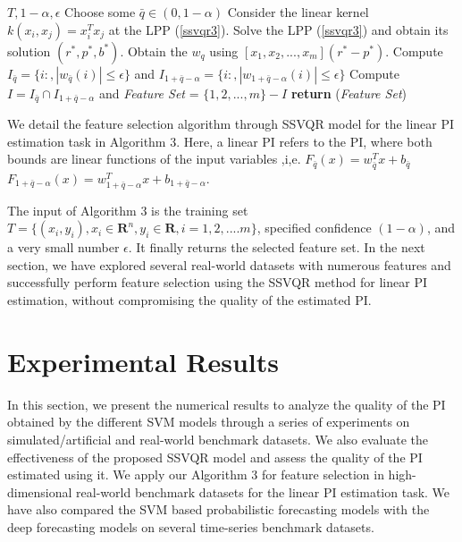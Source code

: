 \documentclass[10pt]{article} %
\begin{document}
\begin{algorithm} 
\caption{Feature selection through SSVQR}\label{alg:euclid}
\begin{algorithmic}[1]
 {$T,1-\alpha, \epsilon$}
\State Choose some $\bar{q} \in (0,1-\alpha)$ 
\State  Consider the linear kernel  $k(x_i,x_j) = x_i ^{T}x_j$ at the  LPP (\ref{ssvqr3}). 
\State  Solve the LPP (\ref{ssvqr3}) and obtain its solution $(r^*,p^*,b^*)$.
\State Obtain  the $w_q$ using  $ [x_1, x_2,...,x_m ](r^*-p^*)$. 
\EndFor \label{euclidendwhile}
\State  Compute $I_{\bar{q}} = \{ i:,| w_{\bar{q}}(i)| \leq \epsilon \}$ and  $I_{1+\bar{q}-\alpha} = \{ i:,| w_{1+\bar{q}-\alpha}(i) | \leq \epsilon \}$
\State Compute $I = I_{\bar{q}} \cap I_{1+\bar{q}-\alpha} $ and \textit{Feature Set} = $\{1,2,...,m\} - I$
\State \textbf{return}  (\textit{Feature Set})
\EndProcedure
\end{algorithmic}
\end{algorithm}
We detail the feature selection algorithm through SSVQR model for the  linear PI estimation task in Algorithm 3. Here, a linear PI refers to  the PI,  where both bounds are linear functions of the input variables ,i,e. $F_{\bar{q}}(x) = w_{\bar{q}}^{T}x + b_{\bar{q}}$  $F_{1+{\bar{q}}-\alpha}(x) = w_{1+{\bar{q}}-\alpha}^{T}x + b_{1+{\bar{q}}-\alpha}$.

The input of Algorithm 3 is the training set $T= \{ (x_i,y_i), x_i \in \mathbf{R}^n, y_i \in \mathbf{R}, i =1,2,....m \}$, specified confidence $(1-\alpha)$, and a very small number $\epsilon$. It finally returns the selected feature set.  In the next section, we  have explored several real-world datasets with numerous features and successfully perform feature selection using the SSVQR method for linear PI estimation, without compromising the quality of the estimated PI.


\section{Experimental Results}
In this section, we present the numerical results to analyze the quality of the PI obtained by the different SVM models through a series of experiments on simulated/artificial and real-world  benchmark datasets. We also evaluate the effectiveness of the proposed SSVQR model and assess the quality of the PI estimated using it.  We apply our Algorithm 3 for feature selection in high-dimensional real-world benchmark datasets for the linear PI estimation task. We have also compared the SVM based probabilistic forecasting models with the deep forecasting models on several time-series benchmark datasets.
\end{document}
